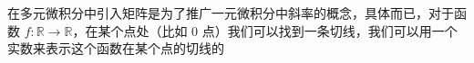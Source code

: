 

在多元微积分中引入矩阵是为了推广一元微积分中斜率的概念，具体而已，对于函数 $f: \mathbb{R} \to \mathbb{R}$，在某个点处（比如 $0$ 点）我们可以找到一条切线，我们可以用一个实数来表示这个函数在某个点的切线的